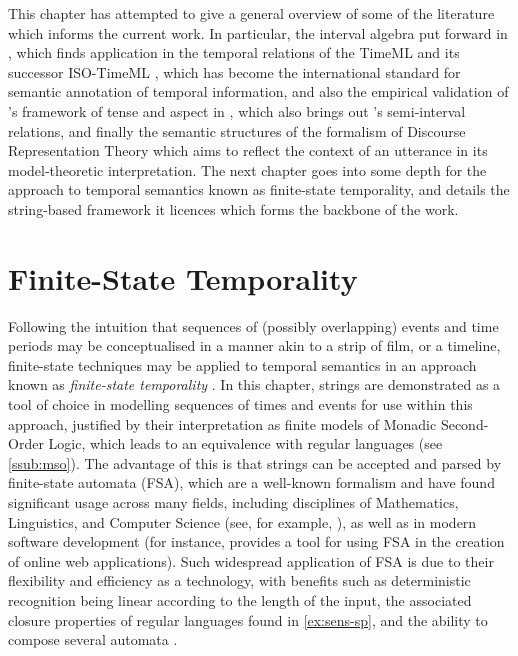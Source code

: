 \documentclass[a4paper,12pt,leqno]{article}
\begin{document}

This chapter has attempted to give a general overview of some of the literature which informs the current work. In particular, the interval algebra put forward in \citet{allen1983maintaining}, which finds application in the temporal relations of the TimeML \citep{timeml2005timeml} and its successor ISO-TimeML \citep{pustejovsky2010iso}, which has become the international standard for semantic annotation of temporal information, and also the empirical validation of \citet{reichenbach1947elements}'s framework of tense and aspect in \citet{Derczynski2013}, which also brings out \citet{Freksa1992}'s semi-interval relations, and finally the semantic structures of the formalism of Discourse Representation Theory \citep{kamp1981theory} which aims to reflect the context of an utterance in its model-theoretic interpretation. The next chapter goes into some depth for the approach to temporal semantics known as finite-state temporality, and details the string-based framework it licences which forms the backbone of the work.

\newpage
\section{Finite-State Temporality}\label{sec:fst}
Following the intuition that sequences of (possibly overlapping) events and time periods may be conceptualised in a manner akin to a strip of film, or a timeline, finite-state techniques may be applied to temporal semantics in an approach known as \textit{finite-state temporality} \citep{fernando2005entailments}. In this chapter, strings are demonstrated as a tool of choice in modelling sequences of times and events for use within this approach, justified by their interpretation as finite models of Monadic Second-Order Logic, which leads to an equivalence with regular languages (see \cref{ssub:mso}). The advantage of this is that strings can be accepted and parsed by finite-state automata (FSA), which are a well-known formalism and have found significant usage across many fields, including disciplines of Mathematics, Linguistics, and Computer Science (see, for example, \citet{buchner1993finite,veanes2012symbolic}), as well as in modern software development (for instance, \citet{khourshid_2015} provides a tool for using FSA in the creation of online web applications). Such widespread application of FSA is due to their flexibility and efficiency as a technology, with benefits such as deterministic recognition being linear according to the length of the input, the associated closure properties of regular languages found in \cref{ex:sens-sp}, and the ability to compose several automata \citep{wintner2007finite}.
\end{document}
